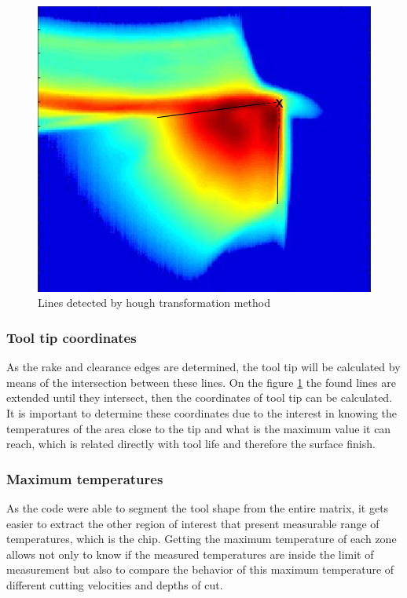 			\begin{figure}[H]
			\centering
			\captionsetup{justification=centering}
			\includegraphics[scale = 0.6]{Imagens/hough.png}
			\caption{Lines detected by hough transformation method}
			\label{fig:hough}
			\end{figure}

		\subsubsection{Tool tip coordinates}

			As the rake and clearance edges are determined, the tool tip will be calculated by means of the intersection between these lines. On the figure \ref{fig:hough} the found lines are extended until they intersect, then the coordinates of tool tip can be calculated. It is important to determine these coordinates due to the interest in knowing the temperatures of the area close to the tip and what is the maximum value it can reach, which is related directly with tool life and therefore the surface finish.

		\subsubsection{Maximum temperatures}

			As the code were able to segment the tool shape from the entire matrix, it gets easier to extract the other region of interest that present measurable range of temperatures, which is the chip. Getting the maximum temperature of each zone allows not only to know if the measured temperatures are inside the limit of measurement but also to compare the behavior of this maximum temperature of different cutting velocities and depths of cut.

